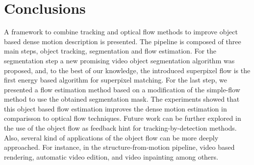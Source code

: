 \section{Conclusions}

A framework to combine tracking and optical flow methods to improve 
object based dense motion description is presented. The pipeline is 
composed of three main steps, object tracking, segmentation and 
flow estimation. For the segmentation step a new promising video object 
segmentation algorithm was proposed, and, to the best of our knowledge, 
the introduced superpixel flow is the first energy based algorithm for superpixel matching.
For the last step, we presented a flow estimation method based on a modification of the simple-flow method to use 
the obtained segmentation mask. The experiments showed that this object based flow estimation improves the dense motion 
estimation in comparisson to optical flow techniques.
Future work can be further explored in the use of the object flow as feedback hint for tracking-by-detection methods. Also, 
several kind of applications of the object flow can be more deeply approached. For instance, 
in the structure-from-motion pipeline, video based rendering, automatic video edition, and video inpainting  among others.



